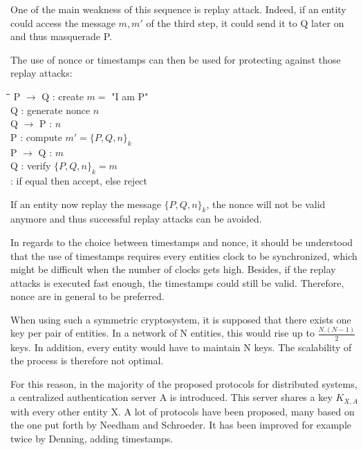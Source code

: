 One of the main weakness of this sequence is replay attack. Indeed, if an entity could access the message $m,m'$ of the third step, it could send it to Q later on and thus masquerade P.

The use of nonce or timestamps can then be used for protecting against those replay attacks:

\begin{tabbing}
	\hspace{4em}\=\hspace{4em}\=\hspace{2em}\=\kill
	\>  P $\rightarrow$ Q\>  : \> create $m =$ "I am P" \\
	\>  Q  \>  : \> generate nonce $n$	\\
	\>  Q $\rightarrow$ P \>  : \> $n$ \\
	\>  P  \>  : \> compute $m' = \lbrace P, Q, n \rbrace_{k}$ 				\\
	\>  P $\rightarrow$ Q \>  : \> $m$ \\
	\>  Q \>  : \> verify $\lbrace P, Q, n \rbrace_{k} = m$ \\
	\>    \>  : \> if equal then accept, else reject \\
\end{tabbing} 

If an entity now replay the message $\lbrace P, Q, n \rbrace_{k}$, the nonce will not be valid anymore and thus successful replay attacks can be avoided.

In regards to the choice between timestamps and nonce, it should be understood that the use of timestamps requires every entities clock to be synchronized, which might be difficult when the number of clocks gets high. Besides, if the replay attacks is executed fast enough, the timestamps could still be valid. Therefore, nonce are in general to be preferred.
\label{02_timestamp_vs_nonce}

When using such a symmetric cryptosystem, it is supposed that there exists one key per pair of entities. In a network of N entities, this would rise up to $\frac{N.(N-1)}{2}$ keys. In addition, every entity would have to maintain N keys. The scalability of the process is therefore not optimal. 

For this reason, in the majority of the proposed protocols for distributed systems, a centralized authentication server A is introduced. This server shares a key $K_{X,A}$ with every other entity X. A lot of protocols have been proposed, many based on the one put forth by Needham and Schroeder\cite{needham1978using}. It has been improved for example twice by Denning\cite{denning1981timestamps}\cite{robling1982cryptography}, adding timestamps. 

